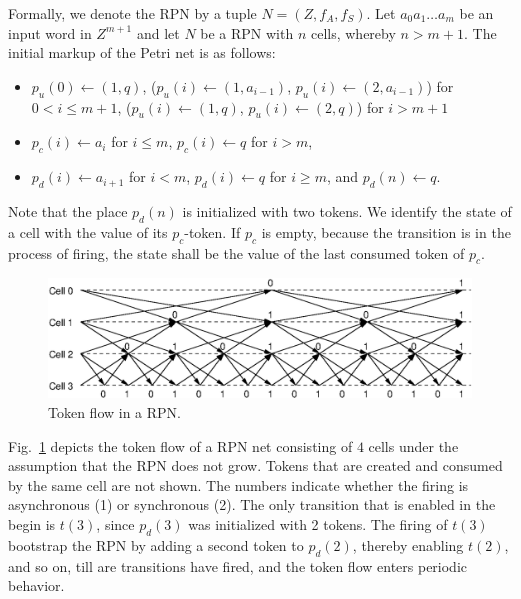 \documentclass[pre,amssymb,showpacs,showkeys,preprint]{revtex4}
\begin{document}
Formally, we denote the RPN by a tuple $N = (Z, f_A, f_S)$.
Let $a_0 a_1 \ldots a_m$ be an input word in $Z^{m+1}$ and let
$N$ be a RPN with $n$ cells, whereby $n > m + 1$.
The initial markup of the Petri net is as follows:
\begin{itemize}
\item $p_u(0) \leftarrow (1, q)$,
($p_u(i) \leftarrow (1, a_{i-1})$, $p_u(i) \leftarrow (2, a_{i-1})$) for $0 < i \leq m + 1$,
($p_u(i) \leftarrow (1, q)$, $p_u(i) \leftarrow (2, q)$) for  $i > m + 1$
\item $p_c(i) \leftarrow a_i$ for $i \leq m$, $p_c(i) \leftarrow q$ for $i > m$,
\item
$p_d(i) \leftarrow a_{i+1}$ for $i < m$, $p_d(i) \leftarrow q$ for $i \geq m$, and $p_d(n) \leftarrow q$.
\end{itemize}
Note that the place $p_d(n)$ is initialized with two tokens.
We identify the state of a cell with the value of its $p_c$-token.
If $p_c$ is empty, because
the transition is in the process of firing, the state shall be the value of the last consumed token of $p_c$.

\begin{figure}
\begin{center}
\includegraphics[scale=0.8]{2008-sica-TokenFlow.eps}
\caption{\label{token-flow} Token flow in a RPN.}
\end{center}
\end{figure}

Fig.~\ref{token-flow} depicts the token flow of a RPN net consisting of $4$ cells under the assumption
that the RPN does not grow.
Tokens that are created and consumed by the same cell are not shown.
The numbers indicate whether the firing is asynchronous (1) or synchronous (2).
The only transition that is enabled in the begin is $t(3)$, since $p_d(3)$ was initialized with 2 tokens.
The firing of $t(3)$ bootstrap the RPN by adding a second token to $p_d(2)$, thereby enabling $t(2)$, and so on,
till are transitions have fired,
and the token flow enters periodic behavior.
\end{document}
